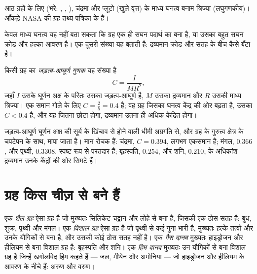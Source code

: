 \begin{omfigure}
{\small आठ ग्रहों के लिए (भरे: , , ), चंद्रमा और प्लूटो (खुले वृत्त)
के माध्य घनत्व बनाम त्रिज्या (लघुगणकीय)। आँकड़े NASA की ग्रह तथ्य-पत्रिका के हैं।}
\end{omfigure}

केवल माध्य घनत्व यह नहीं बता सकता कि ग्रह एक ही सघन पदार्थ का बना है, या उसका बहुत सघन क्रोड और
हल्का आवरण है। एक दूसरी संख्या यह बताती है: द्रव्यमान क्रोड और सतह के बीच कैसे बँटा है।

\begin{definition}[जड़त्व-आघूर्ण गुणक]\label{def:b1:comparative-planetology:moi}
किसी ग्रह का \emph{जड़त्व-आघूर्ण गुणक} यह संख्या है
\[
  C = \frac{I}{MR^2} ,
\]
जहाँ $I$ उसके घूर्णन अक्ष के परितः उसका जड़त्व-आघूर्ण है, $M$ उसका द्रव्यमान और $R$ उसकी माध्य
त्रिज्या। एक समान गोले के लिए $C = \tfrac25 = 0.4$ है; वह ग्रह जिसका घनत्व केंद्र की ओर बढ़ता है,
उसका $C < 0.4$ है, और यह जितना छोटा होगा, द्रव्यमान उतना ही अधिक केंद्रित होगा।
\end{definition}

जड़त्व-आघूर्ण घूर्णन अक्ष की सूर्य के खिंचाव से होने वाली धीमी अग्रगति से, और ग्रह के गुरुत्व क्षेत्र
के चपटेपन के साथ, मापा जाता है। मान रोचक हैं: चंद्रमा, $C = 0.394$, लगभग एकसमान है; मंगल, $0.366$,
और पृथ्वी, $0.3308$, स्पष्ट रूप से परतदार हैं; बृहस्पति, $0.254$, और शनि, $0.210$, के अधिकांश
द्रव्यमान उनके केंद्रों की ओर सिमटे हैं।

\section{ग्रह किस चीज़ से बने हैं}

\begin{definition}[शैल-ग्रह और विशाल ग्रह]\label{def:b1:comparative-planetology:planet-types}
एक \emph{शैल-ग्रह} ऐसा ग्रह है जो मुख्यतः सिलिकेट चट्टान और लोहे से बना है, जिसकी
एक ठोस सतह है: बुध, शुक्र, पृथ्वी और मंगल। एक \emph{विशाल ग्रह} ऐसा ग्रह है जो
पृथ्वी से कई गुना भारी है, मुख्यतः हल्के तत्वों और उनके यौगिकों से बना है, और उसकी कोई ठोस सतह नहीं
है। एक \emph{गैस दानव} मुख्यतः हाइड्रोजन और हीलियम से बना विशाल ग्रह है: बृहस्पति
और शनि। एक \emph{हिम दानव} मुख्यतः उन यौगिकों से बना विशाल ग्रह है जिन्हें
खगोलविद हिम कहते हैं --- जल, मीथेन और अमोनिया --- जो हाइड्रोजन और हीलियम के आवरण के नीचे हैं:
अरुण और वरुण।
\end{definition}

